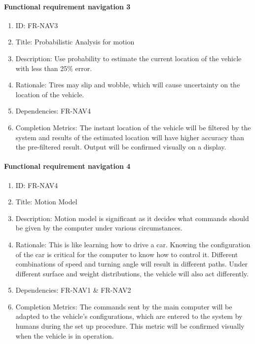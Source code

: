 \documentclass[compsoc,draftclsnofoot,onecolumn,10pt]{IEEEtran}
\begin{document}
	\paragraph{Functional requirement navigation 3}
		\begin{enumerate}
			\item ID: FR-NAV3
			\item Title: Probabilistic Analysis for motion
			\item Description: Use probability to estimate the current location of the vehicle with less than 25\% error.
			\item Rationale: Tires may slip and wobble, which will cause uncertainty on the location of the vehicle.
			\item Dependencies: FR-NAV4
			\item Completion Metrics: The instant location of the vehicle will be filtered by the system and results of the estimated location will have higher accuracy than the pre-filtered result. Output will be confirmed visually on a display. 
		\end{enumerate}

	\paragraph{Functional requirement navigation 4}
		\begin{enumerate}
			\item ID: FR-NAV4
			\item Title: Motion Model
			\item Description: Motion model is significant as it decides what commands should be given by the computer under various circumstances.
			\item Rationale: This is like learning how to drive a car. Knowing the configuration of the car is critical for the computer to know how to control it. Different combinations of speed and turning angle will result in different paths. Under different surface and weight distributions, the vehicle will also act differently.
			\item Dependencies: FR-NAV1 \& FR-NAV2
			\item Completion Metrics: The commands sent by the main computer will be adapted to the vehicle's configurations, which are entered to the system by humans during the set up procedure. 
			This metric will be confirmed visually when the vehicle is in operation.  
		\end{enumerate} 
\end{document}
